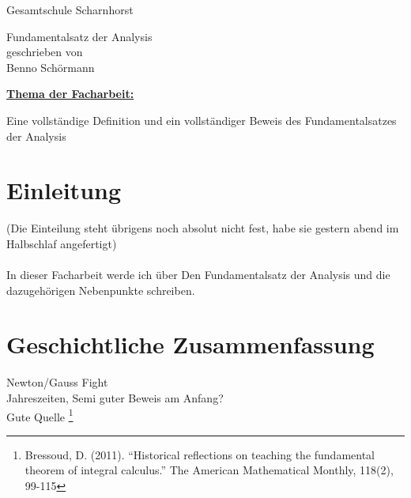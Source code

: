 \documentclass[fontsize=12pt,paper=a4,DIV12,cleardoublepage=empty, 
liststotoc,idxtotoc,bibtotoc]{article}
\theoremstyle{plain}
\theoremstyle{definition}
\begin{document}
	\begin{titlepage}
		\vspace*{-3cm}
		\noindent
		\hspace*{1cm}
			\begin{center}
				\centering
				{\LARGE Gesamtschule Scharnhorst}
			\end{center}
		\begin{center}
		\Large{Fundamentalsatz der Analysis}\\[0.5cm]
		\normalsize{geschrieben von}\\[0.25cm]	
		\large{Benno Schörmann}\\[0.5cm]
		\end{center}
	\begin{flushleft}
	\hyperref[subsec:thema1]{\textbf{\large Thema der Facharbeit:}}  \\
	\end{flushleft}
	Eine vollständige Definition und ein vollständiger Beweis des Fundamentalsatzes der Analysis
	\quad \\[1.5cm]
	\noindent 
	\renewcommand{\arraystretch}{1.4}
	\end{titlepage}
	\newpage
	\thispagestyle{empty}
	\tableofcontents
	\newpage
	\section{Einleitung}
	(Die Einteilung steht übrigens noch absolut nicht fest, habe sie gestern abend im Halbschlaf angefertigt) \\\\
	In dieser Facharbeit werde ich über Den Fundamentalsatz der Analysis und die dazugehörigen Nebenpunkte schreiben.
	
	
	
	\section{Geschichtliche Zusammenfassung}
	Newton/Gauss Fight\\
	Jahreszeiten, Semi guter Beweis am Anfang?\\
	Gute Quelle \footnote{Bressoud, D. (2011). “Historical reflections on teaching the fundamental theorem of integral calculus.” The American Mathematical Monthly, 118(2), 99-115}
	
\end{document}
